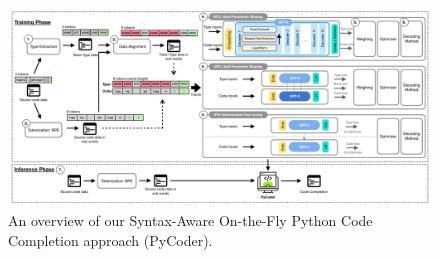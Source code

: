 



\begin{figure}
    \centering
    \includegraphics[width=\textwidth]{figures/overview.pdf}
    \caption{
    An overview of our Syntax-Aware On-the-Fly Python Code Completion approach (PyCoder). 
    }
    \label{fig:overview}
\end{figure}

